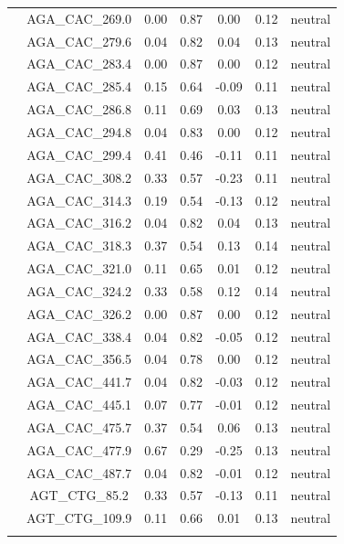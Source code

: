 \documentclass[11pt,]{article}
\begin{document}
\begin{longtable}[c]{@{}lcccccc@{}}
\\\addlinespace
& AGA\_CAC\_269.0 & 0.00 & 0.87 & 0.00 & 0.12 & neutral
\\\addlinespace
& AGA\_CAC\_279.6 & 0.04 & 0.82 & 0.04 & 0.13 & neutral
\\\addlinespace
& AGA\_CAC\_283.4 & 0.00 & 0.87 & 0.00 & 0.12 & neutral
\\\addlinespace
& AGA\_CAC\_285.4 & 0.15 & 0.64 & -0.09 & 0.11 & neutral
\\\addlinespace
& AGA\_CAC\_286.8 & 0.11 & 0.69 & 0.03 & 0.13 & neutral
\\\addlinespace
& AGA\_CAC\_294.8 & 0.04 & 0.83 & 0.00 & 0.12 & neutral
\\\addlinespace
& AGA\_CAC\_299.4 & 0.41 & 0.46 & -0.11 & 0.11 & neutral
\\\addlinespace
& AGA\_CAC\_308.2 & 0.33 & 0.57 & -0.23 & 0.11 & neutral
\\\addlinespace
& AGA\_CAC\_314.3 & 0.19 & 0.54 & -0.13 & 0.12 & neutral
\\\addlinespace
& AGA\_CAC\_316.2 & 0.04 & 0.82 & 0.04 & 0.13 & neutral
\\\addlinespace
& AGA\_CAC\_318.3 & 0.37 & 0.54 & 0.13 & 0.14 & neutral
\\\addlinespace
& AGA\_CAC\_321.0 & 0.11 & 0.65 & 0.01 & 0.12 & neutral
\\\addlinespace
& AGA\_CAC\_324.2 & 0.33 & 0.58 & 0.12 & 0.14 & neutral
\\\addlinespace
& AGA\_CAC\_326.2 & 0.00 & 0.87 & 0.00 & 0.12 & neutral
\\\addlinespace
& AGA\_CAC\_338.4 & 0.04 & 0.82 & -0.05 & 0.12 & neutral
\\\addlinespace
& AGA\_CAC\_356.5 & 0.04 & 0.78 & 0.00 & 0.12 & neutral
\\\addlinespace
& AGA\_CAC\_441.7 & 0.04 & 0.82 & -0.03 & 0.12 & neutral
\\\addlinespace
& AGA\_CAC\_445.1 & 0.07 & 0.77 & -0.01 & 0.12 & neutral
\\\addlinespace
& AGA\_CAC\_475.7 & 0.37 & 0.54 & 0.06 & 0.13 & neutral
\\\addlinespace
& AGA\_CAC\_477.9 & 0.67 & 0.29 & -0.25 & 0.13 & neutral
\\\addlinespace
& AGA\_CAC\_487.7 & 0.04 & 0.82 & -0.01 & 0.12 & neutral
\\\addlinespace
& AGT\_CTG\_85.2 & 0.33 & 0.57 & -0.13 & 0.11 & neutral
\\\addlinespace
& AGT\_CTG\_109.9 & 0.11 & 0.66 & 0.01 & 0.13 & neutral
\\\addlinespace

\end{longtable}
\end{document}
